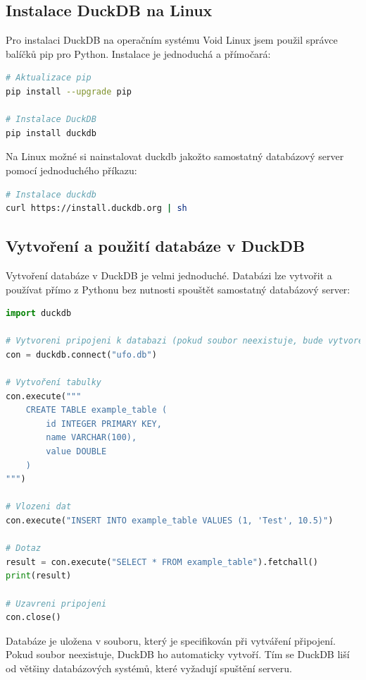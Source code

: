 \documentclass[a4paper,12pt]{article}
\begin{document}
\subsection{Instalace DuckDB na Linux}
Pro instalaci DuckDB na operačním systému Void Linux jsem použil správce balíčků pip pro Python. Instalace je jednoduchá a přímočará:

\begin{lstlisting}[language=bash, caption=Instalace DuckDB pomocí pip]
# Aktualizace pip
pip install --upgrade pip

# Instalace DuckDB
pip install duckdb
\end{lstlisting}

Na Linux možné si nainstalovat duckdb jakožto samostatný databázový server pomocí jednoduchého příkazu:

\begin{lstlisting}[language=bash, caption=Instalace duckdb na linux zařizeních pomocí příkazu]
# Instalace duckdb
curl https://install.duckdb.org | sh
\end{lstlisting}

\subsection{Vytvoření a použití databáze v DuckDB}

Vytvoření databáze v DuckDB je velmi jednoduché. Databázi lze vytvořit a používat přímo z Pythonu bez nutnosti spouštět samostatný databázový server:

\begin{lstlisting}[language=python, caption=Vytvoření a připojení k databázi v DuckDB]
import duckdb

# Vytvoreni pripojeni k databazi (pokud soubor neexistuje, bude vytvoren)
con = duckdb.connect("ufo.db")

# Vytvoření tabulky
con.execute("""
    CREATE TABLE example_table (
        id INTEGER PRIMARY KEY,
        name VARCHAR(100),
        value DOUBLE
    )
""")

# Vlozeni dat
con.execute("INSERT INTO example_table VALUES (1, 'Test', 10.5)")

# Dotaz
result = con.execute("SELECT * FROM example_table").fetchall()
print(result)

# Uzavreni pripojeni
con.close()
\end{lstlisting}

Databáze je uložena v souboru, který je specifikován při vytváření připojení. Pokud soubor neexistuje, DuckDB ho automaticky vytvoří. Tím se DuckDB liší od většiny databázových systémů, které vyžadují spuštění serveru.
\end{document}
